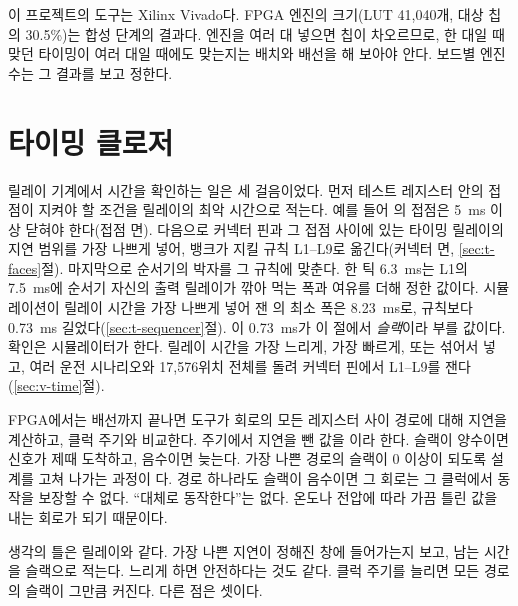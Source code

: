\Ours 이 프로젝트의 도구는 Xilinx Vivado다. FPGA 엔진의 크기(LUT 41,040개, 대상 칩의 30.5\%)는 합성
단계의 결과다. 엔진을 여러 대 넣으면 칩이 차오르므로, 한 대일 때 맞던 타이밍이 여러 대일 때에도 맞는지는
배치와 배선을 해 보아야 안다. 보드별 엔진 수는 그 결과를 보고 정한다.

\section{타이밍 클로저}\label{sec:timing}

\Relay 릴레이 기계에서 시간을 확인하는 일은 세 걸음이었다. 먼저 테스트 레지스터 안의 접점이 지켜야 할
조건을 릴레이의 최악 시간으로 적는다. 예를 들어 의 접점은 5~ms 이상 닫혀야 한다(접점 면).
다음으로 커넥터 핀과 그 접점 사이에 있는 타이밍 릴레이의 지연 범위를 가장 나쁘게 넣어, 뱅크가 지킬 규칙
L1--L9로 옮긴다(커넥터 면, \ref{sec:t-faces}절). 마지막으로 순서기의 박자를 그 규칙에 맞춘다. 한 틱 6.3~ms는
L1의 7.5~ms에 순서기 자신의 출력 릴레이가 깎아 먹는 폭과 여유를 더해 정한 값이다. 시뮬레이션이 릴레이 시간을
가장 나쁘게 넣어 잰 의 최소 폭은 8.23~ms로, 규칙보다 0.73~ms 길었다(\ref{sec:t-sequencer}절). 이
0.73~ms가 이 절에서 \emph{슬랙}이라 부를 값이다. 확인은 시뮬레이터가 한다. 릴레이 시간을 가장 느리게, 가장
빠르게, 또는 섞어서 넣고, 여러 운전 시나리오와 17,576위치 전체를 돌려 커넥터 핀에서 L1--L9를 잰다
(\ref{sec:v-time}절).

\Why FPGA에서는 배선까지 끝나면 도구가 회로의 모든 레지스터 사이 경로에 대해 지연을 계산하고, 클럭 주기와
비교한다. 주기에서 지연을 뺀 값을 이라 한다. 슬랙이 양수이면 신호가 제때 도착하고,
음수이면 늦는다. 가장 나쁜 경로의 슬랙이 0 이상이 되도록 설계를 고쳐 나가는 과정이
다. 경로 하나라도 슬랙이 음수이면 그 회로는 그 클럭에서 동작을 보장할
수 없다. ``대체로 동작한다''는 없다. 온도나 전압에 따라 가끔 틀린 값을 내는 회로가 되기 때문이다.

생각의 틀은 릴레이와 같다. 가장 나쁜 지연이 정해진 창에 들어가는지 보고, 남는 시간을 슬랙으로 적는다.
느리게 하면 안전하다는 것도 같다. 클럭 주기를 늘리면 모든 경로의 슬랙이 그만큼 커진다. 다른 점은 셋이다.

